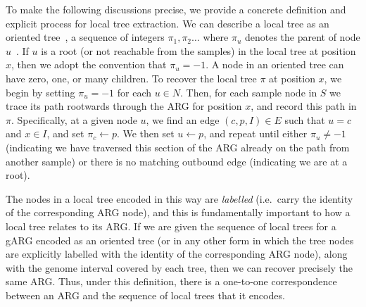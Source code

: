 \documentclass{article}
\begin{document}
To make the following discussions precise, we provide
a concrete definition and explicit process for local tree extraction.
We can describe a local tree as an
oriented tree~\cite[p.\ 461]{knuth11combinatorial},
a sequence of integers $\pi_1, \pi_2\dots$ where $\pi_u$ denotes the parent of
node $u$~\citep{kelleher2013coalescent,kelleher2014coalescent,kelleher2016efficient}.
If $u$ is a root
(or not reachable from the samples)
in the local tree at position $x$, then we adopt the convention that $\pi_u = -1$.
A node in an oriented tree can have
zero, one,
or many children.
To recover the local tree $\pi$ at position $x$, we begin by
setting $\pi_u = -1$ for each $u\in N$. Then, for each sample
node in $S$ we trace its path rootwards through the
ARG for position $x$, and record this path in $\pi$.
Specifically, at a given node $u$,
we find an edge $(c, p, I) \in E$ such that $u = c$ and $x \in I$, and set
$\pi_c \leftarrow p$. We then set $u \leftarrow p$, and repeat
until either $\pi_u \neq -1$ (indicating we have traversed this section
of the ARG already on the path from another sample) or there
is no matching outbound edge (indicating we are at a root).

The nodes in a local tree encoded
in this way are \emph{labelled} (i.e.\ carry the identity
of the corresponding ARG node), and this is fundamentally
important to how a local tree relates to its ARG.
If we are given the sequence of local trees for a gARG
encoded as an oriented tree (or in any other form in which
the tree nodes are explicitly labelled with the identity of the
corresponding ARG node),
along with the genome interval covered by each tree,
then we can recover precisely the same ARG. Thus, under this
definition, there
is a one-to-one correspondence between an ARG and
the sequence of local trees that it encodes.
\end{document}
